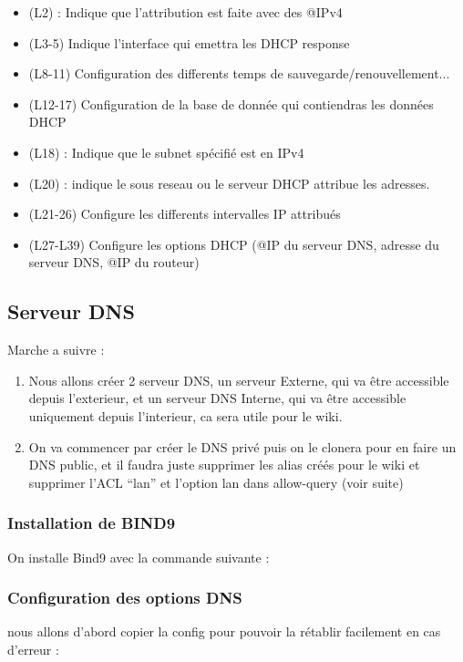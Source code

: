 \documentclass{article}
\begin{document}
\begin{itemize}
	\item (L2)  : Indique que l'attribution est faite avec des @IPv4
	\item (L3-5) Indique l'interface qui emettra les DHCP response
	\item (L8-11) Configuration des differents temps de sauvegarde/renouvellement...
	\item (L12-17) Configuration de la base de donnée qui contiendras les données DHCP
	\item (L18)  : Indique que le subnet spécifié est en IPv4
	\item (L20)  : indique le sous reseau ou le serveur DHCP attribue les adresses.
	\item (L21-26) Configure les differents intervalles IP attribués
	\item (L27-L39) Configure les options DHCP (@IP du serveur DNS, adresse du serveur DNS, @IP du routeur)
\end{itemize}

\subsection{Serveur DNS}
Marche a suivre :
\begin{enumerate}
	\item Nous allons créer 2 serveur DNS, un serveur Externe, qui va être accessible depuis l’exterieur, et un serveur DNS Interne, qui va être accessible uniquement depuis l’interieur, ca sera utile pour le wiki. 
	\item On va commencer par créer le DNS privé puis on le clonera pour en faire un DNS public, et il faudra juste supprimer les alias créés pour le wiki et supprimer l’ACL “lan” et l’option lan dans allow-query (voir suite)
\end{enumerate}

\subsubsection{Installation de BIND9}
On installe Bind9 avec la commande suivante :

\subsubsection{Configuration des options DNS}
nous allons d'abord copier la config pour pouvoir la rétablir facilement en cas d'erreur :
\end{document}
